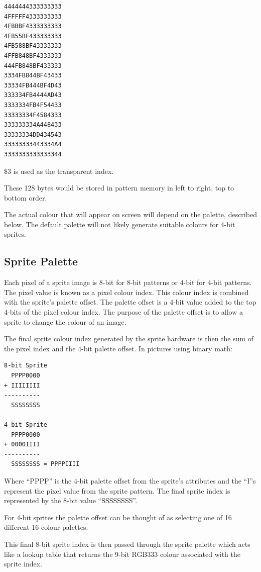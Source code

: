 \begin{verbatim}
4444444333333333
4FFFFF4333333333
4FBBBF4333333333
4FB55BF433333333
4FB588BF43333333
4FFB848BF4333333
444FB848BF433333
3334FB844BF43433
33334FB444BF4D43
333334FB4444AD43
3333334FB4F54433
33333334F4584333
333333334A448433
33333334DD434543
33333333443334A4
3333333333333344
\end{verbatim}

\$3 is used as the transparent index.

These 128 bytes would be stored in pattern memory in left to right,
top to bottom order.
\einset

The actual colour that will appear on screen will depend on the
palette, described below. The default palette will not likely generate
suitable colours for 4-bit sprites.

\subsection{Sprite Palette}
Each pixel of a sprite image is 8-bit for 8-bit patterns or 4-bit for
4-bit patterns. The pixel value is known as a pixel colour index. This
colour index is combined with the sprite’s palette offset. The palette
offset is a 4-bit value added to the top 4-bits of the pixel colour
index. The purpose of the palette offset is to allow a sprite to
change the colour of an image.

The final sprite colour index generated by the sprite hardware is then
the sum of the pixel index and the 4-bit palette offset. In pictures
using binary math:

\begin{verbatim}
8-bit Sprite
  PPPP0000
+ IIIIIIII
----------
  SSSSSSSS

4-bit Sprite
  PPPP0000
+ 0000IIII
----------
  SSSSSSSS = PPPPIIII
\end{verbatim}

Where “PPPP” is the 4-bit palette offset from the sprite’s attributes
and the “I”s represent the pixel value from the sprite pattern. The
final sprite index is represented by the 8-bit value “SSSSSSSS”.

For 4-bit sprites the palette offset can be thought of as selecting
one of 16 different 16-colour palettes.

This final 8-bit sprite index is then passed through the sprite
palette which acts like a lookup table that returns the 9-bit RGB333
colour associated with the sprite index.

